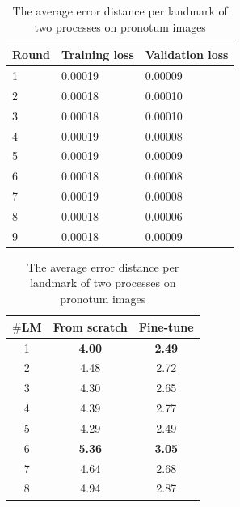\documentclass[review]{elsarticle}
\begin{document}
\begin{table}[htbp]
	\begin{minipage}[t]{0.45\textwidth}
	\centering
	\begin{tabular}{l p{1.5cm} p{1.5cm}}
	Round & Training loss & Validation loss \\ \hline
	1 & 0.00019 & 0.00009  \\ \hline
	2 & 0.00018 & 0.00010 \\ \hline
	3 & 0.00018 & 0.00010 \\ \hline
	4 & 0.00019 & 0.00008 \\ \hline
	5 & 0.00019 & 0.00009 \\ \hline
	6 & 0.00018 & 0.00008 \\ \hline
	7 & 0.00019 & 0.00008 \\ \hline
	8 & 0.00018 & 0.00006 \\ \hline
	9 & 0.00018 & 0.00009 \\ \hline
	\end{tabular}
	\caption{The losses during fine-tuning model on pronotum dataset}
	\label{tblftpronotum}
\end{minipage}
\hfill
\begin{minipage}[t]{0.45\textwidth}
\centering
\begin{tabular}{|c|c|c|}
\hline
\textbf{$\#$LM} & \textbf{From scratch} & \textbf{Fine-tune} \\ \hline
1 & \textbf{4.00} & \textbf{2.49}  \\ \hline
2 & 4.48 & 2.72  \\ \hline
3 & 4.30  & 2.65 \\ \hline
4 & 4.39  & 2.77 \\ \hline
5 & 4.29  & 2.49 \\ \hline
6 & \textbf{5.36}  & \textbf{3.05} \\ \hline
7 & 4.64  & 2.68 \\ \hline
8 & 4.94  & 2.87 \\ \hline
\end{tabular}
\caption{The average error distance per landmark of two processes on pronotum images}
\label{tblcmppronotum}
\end{minipage}
\end{table}
\end{document}
